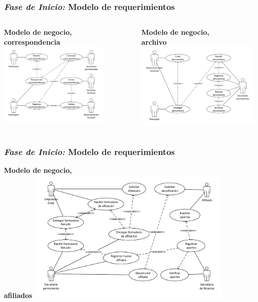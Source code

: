 \documentclass[xcolor=dvipsnames, xcolor=table]{beamer}
\begin{document}
\begin{frame}
    \frametitle{\textit{Fase de Inicio:} Modelo de requerimientos}
    \begin{columns}
      \begin{column}{0.45\textwidth}
        \centering\textbf{\textcolor{color3}{\small Modelo de negocio,\\ correspondencia}\vspace{4mm}}
        \centering\includegraphics[width=5.3cm]{CUcorr}
      \end{column}
      \begin{column}{0.55\textwidth}
        \centering\textbf{\textcolor{color3}{\small Modelo de negocio,\\archivo}\vspace{4mm}}
        \includegraphics[width=6cm]{CUarc}
      \end{column}
    \end{columns}
\end{frame}

\begin{frame}
    \frametitle{\textit{Fase de Inicio:} Modelo de requerimientos}
         \centering\textbf{\textcolor{color3}{\small Modelo de negocio,\\ afiliados}\vspace{2mm}}
        \centering\includegraphics[width=10cm]{CUafl}
\end{frame}
\end{document}
